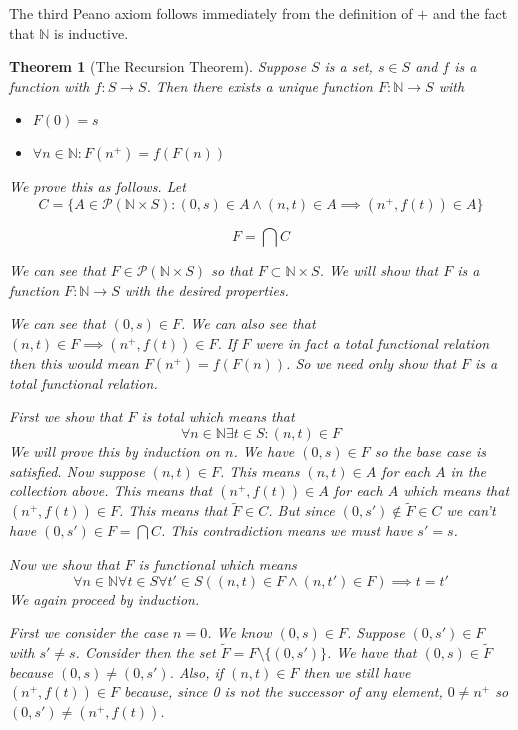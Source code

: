 \documentclass[12pt]{article}
\theoremstyle{break}
\theoremstyle{break}
\newtheorem{theorem}{Theorem}[section]
\theoremstyle{break}
\theoremstyle{break}
\theoremstyle{break}
\newtheorem{informal definition}[definition]{Informal Definition}
\begin{document}
The third Peano axiom follows immediately from the definition of $+$ and the fact that $\mathbb{N}$ is inductive.



\begin{theorem}[The Recursion Theorem]
Suppose $S$ is a set, $s\in S$ and $f$ is a function with $f:S \to S$.
Then there exists a unique function $F:\mathbb{N}\to S$ with
\begin{itemize}
\item{$F(0) = s$}
\item{$\forall n \in \mathbb{N}: F(n^+) = f(F(n))$}
\end{itemize}

We prove this as follows.
Let
$$
C = \{A \in \mathcal{P}(\mathbb{N}\times S): (0, s)\in A \land (n, t)\in A \implies (n^+, f(t))\in A\}
$$

$$
F = \bigcap C
$$

We can see that $F\in \mathcal{P}(\mathbb{N} \times S)$ so that $F \subset \mathbb{N} \times S$.
We will show that $F$ is a function $F:\mathbb{N} \to S$ with the desired properties.

We can see that $(0, s) \in F$.
We can also see that $(n, t)\in F \implies (n^+, f(t)) \in F$.
If $F$ were in fact a total functional relation then this would mean $F(n^+) = f(F(n))$.
So we need only show that $F$ is a total functional relation.

First we show that $F$ is total which means that
$$
\forall n \in \mathbb{N} \exists t\in S: (n, t) \in F
$$
We will prove this by induction on $n$.
We have $(0, s) \in F$ so the base case is satisfied.
Now suppose $(n, t)\in F$.
This means $(n, t) \in A$ for each $A$ in the collection above.
This means that $(n^+, f(t))\in A$ for each $A$ which means that $(n^+, f(t)) \in F$.
This means that $\tilde{F} \in C$.
But since $(0, s') \not \in \tilde{F} \in C$ we can't have $(0, s') \in F = \bigcap C$.
This contradiction means we must have $s'=s$.

Now we show that $F$ is functional which means
$$
\forall n\in \mathbb{N} \forall t \in S \forall t' \in S \left((n, t) \in F \land (n, t')\in F\right) \implies t=t'
$$
We again proceed by induction.

First we consider the case $n=0$.
We know $(0, s)\in F$.
Suppose $(0, s')\in F$ with $s'\not = s$.
Consider then the set $\tilde{F} = F\setminus \{(0, s')\}$.
We have that $(0, s) \in \tilde{F}$ because $(0, s) \not = (0, s')$.
Also, if $(n, t)\in F$ then we still have $(n^+, f(t)) \in F$ because, since 0 is not the successor of any element, $0 \not = n^+$ so $(0, s') \not = (n^+, f(t))$.


\end{theorem}
\end{document}
